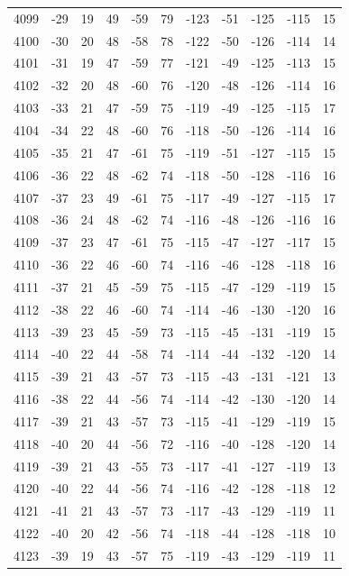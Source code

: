 \begin{table}[H]
\begin{tabular}{lllllllllll}
4099 & -29 & 19 & 49 & -59 & 79 & -123 & -51 & -125 & -115 & 15 \\
4100 & -30 & 20 & 48 & -58 & 78 & -122 & -50 & -126 & -114 & 14 \\
4101 & -31 & 19 & 47 & -59 & 77 & -121 & -49 & -125 & -113 & 15 \\
4102 & -32 & 20 & 48 & -60 & 76 & -120 & -48 & -126 & -114 & 16 \\
4103 & -33 & 21 & 47 & -59 & 75 & -119 & -49 & -125 & -115 & 17 \\
4104 & -34 & 22 & 48 & -60 & 76 & -118 & -50 & -126 & -114 & 16 \\
4105 & -35 & 21 & 47 & -61 & 75 & -119 & -51 & -127 & -115 & 15 \\
4106 & -36 & 22 & 48 & -62 & 74 & -118 & -50 & -128 & -116 & 16 \\
4107 & -37 & 23 & 49 & -61 & 75 & -117 & -49 & -127 & -115 & 17 \\
4108 & -36 & 24 & 48 & -62 & 74 & -116 & -48 & -126 & -116 & 16 \\
4109 & -37 & 23 & 47 & -61 & 75 & -115 & -47 & -127 & -117 & 15 \\
4110 & -36 & 22 & 46 & -60 & 74 & -116 & -46 & -128 & -118 & 16 \\
4111 & -37 & 21 & 45 & -59 & 75 & -115 & -47 & -129 & -119 & 15 \\
4112 & -38 & 22 & 46 & -60 & 74 & -114 & -46 & -130 & -120 & 16 \\
4113 & -39 & 23 & 45 & -59 & 73 & -115 & -45 & -131 & -119 & 15 \\
4114 & -40 & 22 & 44 & -58 & 74 & -114 & -44 & -132 & -120 & 14 \\
4115 & -39 & 21 & 43 & -57 & 73 & -115 & -43 & -131 & -121 & 13 \\
4116 & -38 & 22 & 44 & -56 & 74 & -114 & -42 & -130 & -120 & 14 \\
4117 & -39 & 21 & 43 & -57 & 73 & -115 & -41 & -129 & -119 & 15 \\
4118 & -40 & 20 & 44 & -56 & 72 & -116 & -40 & -128 & -120 & 14 \\
4119 & -39 & 21 & 43 & -55 & 73 & -117 & -41 & -127 & -119 & 13 \\
4120 & -40 & 22 & 44 & -56 & 74 & -116 & -42 & -128 & -118 & 12 \\
4121 & -41 & 21 & 43 & -57 & 73 & -117 & -43 & -129 & -119 & 11 \\
4122 & -40 & 20 & 42 & -56 & 74 & -118 & -44 & -128 & -118 & 10 \\
4123 & -39 & 19 & 43 & -57 & 75 & -119 & -43 & -129 & -119 & 11 \\

\end{tabular}
\end{table}
